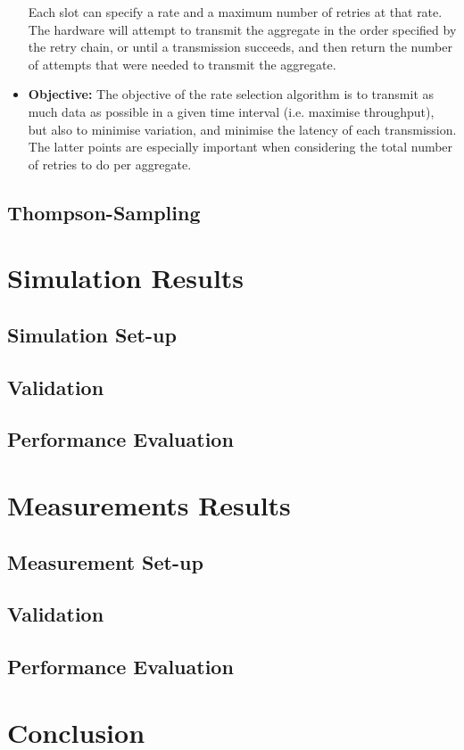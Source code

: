 \documentclass{sig-alternate}
\begin{document}
\begin{itemize}
          Each slot can specify a rate and a maximum number of retries at that
          rate. The hardware will attempt to transmit the aggregate in the order
          specified by the retry chain, or until a transmission succeeds, and
          then return the number of attempts that were needed to transmit the
          aggregate.

        \item \textbf{Objective:} The objective of the rate selection algorithm
          is to transmit as much data as possible in a given time interval (i.e.
          maximise throughput), but also to minimise variation, and minimise the
          latency of each transmission. The latter points are especially
          important when considering the total number of retries to do per
          aggregate.
        \end{itemize}


	\subsection{Thompson-Sampling}
	\label{s:minstrel-blues}


	\section{Simulation Results}
	\label{s:simulations}

	\subsection{Simulation Set-up}

	\subsection{Validation}

	\subsection{Performance Evaluation}


	\section{Measurements Results}
	\label{s:measurements}

	\subsection{Measurement Set-up}

	\subsection{Validation}

	\subsection{Performance Evaluation}


	\section{Conclusion}
	\label{s:conclusion}


	{
	
	\small
	
	}

\end{document}

